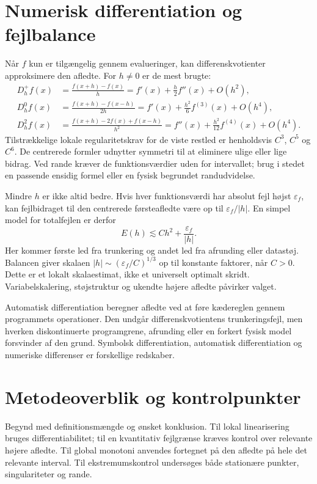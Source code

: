 \section{Numerisk differentiation og fejlbalance}
\label{sec:numerisk}
Når $f$ kun er tilgængelig gennem evalueringer, kan differenskvotienter approksimere den afledte. For $h\ne0$ er de mest brugte:
\begin{align*}
 D_h^+f(x)&=\frac{f(x+h)-f(x)}{h}
           =f'(x)+\tfrac h2f''(x)+O(h^2),\\
 D_h^0f(x)&=\frac{f(x+h)-f(x-h)}{2h}
           =f'(x)+\tfrac{h^2}{6}f^{(3)}(x)+O(h^4),\\
 D_h^2f(x)&=\frac{f(x+h)-2f(x)+f(x-h)}{h^2}
           =f''(x)+\tfrac{h^2}{12}f^{(4)}(x)+O(h^4).
\end{align*}
Tilstrækkelige lokale regularitetskrav for de viste restled er henholdsvis $C^3$, $C^5$ og $C^6$. De centrerede formler udnytter symmetri til at eliminere ulige eller lige bidrag. Ved rande kræver de funktionsværdier uden for intervallet; brug i stedet en passende ensidig formel eller en fysisk begrundet randudvidelse.

Mindre $h$ er ikke altid bedre. Hvis hver funktionsværdi har absolut fejl højst $\varepsilon_f$, kan fejlbidraget til den centrerede førsteafledte være op til $\varepsilon_f/|h|$. En simpel model for totalfejlen er derfor
\[
 E(h)\lesssim C h^2+\frac{\varepsilon_f}{|h|}.
\]
Her kommer første led fra trunkering og andet led fra afrunding eller datastøj. Balancen giver skalaen $|h|\sim(\varepsilon_f/C)^{1/3}$ op til konstante faktorer, når $C>0$. Dette er et lokalt skalaestimat, ikke et universelt optimalt skridt. Variabelskalering, støjstruktur og ukendte højere afledte påvirker valget.



Automatisk differentiation beregner afledte ved at føre kædereglen gennem programmets operationer. Den undgår differenskvotientens trunkeringsfejl, men hverken diskontinuerte programgrene, afrunding eller en forkert fysisk model forsvinder af den grund. Symbolsk differentiation, automatisk differentiation og numeriske differenser er forskellige redskaber.

\clearpage
\section{Metodeoverblik og kontrolpunkter}
\label{sec:kontrol}
Begynd med definitionsmængde og ønsket konklusion. Til lokal linearisering bruges differentiabilitet; til en kvantitativ fejlgrænse kræves kontrol over relevante højere afledte. Til global monotoni anvendes fortegnet på den afledte på hele det relevante interval. Til ekstremumskontrol undersøges både stationære punkter, singulariteter og rande.

